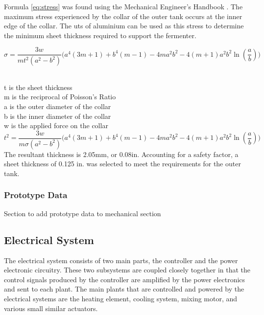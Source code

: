 \documentclass{article}
\begin{document}
Formula \ref{eq:stress} was found using the Mechanical Engineer's Handbook \cite{mech-handbook}.
The maximum stress experienced by the collar of the outer tank occurs at the inner edge of the collar.  The \gls{uts} of aluminium can be used as this stress to determine the minimum sheet thickness required to support the fermenter.

\begin{equation}
\sigma = \frac{3w}{mt^{2}(a^{2} - b^{2})}\Big(a^{4}(3m + 1) + b^{4}(m - 1) - 4ma^{2}b^{2} - 4(m + 1)a^{2}b^{2}\ln(\frac{a}{b}) \Big)
\label{eq:stress}
\end{equation}

 \\
t is the sheet thickness\\
m is the reciprocal of Poisson's Ratio\\
a is the outer diameter of the collar\\
b is the inner diameter of the collar\\
w is the applied force on the collar\\

\begin{equation}
t^{2} = \frac{3w}{m\sigma(a^{2} - b^{2})}\Big(a^{4}(3m + 1) + b^{4}(m - 1) - 4ma^{2}b^{2} - 4(m + 1)a^{2}b^{2}\ln(\frac{a}{b}) \Big)
\end{equation}
The resultant thickness is 2.05mm, or 0.08in. Accounting for a safety factor, a sheet thickness of 0.125 in. was selected to meet the requirements for the outer tank.

\subsubsection{Prototype Data}
Section to add prototype data to mechanical section

\subsection{Electrical System}
The electrical system consists of two main parts, the controller and the power electronic circuitry. These two subsystems are coupled closely together in that the control signals produced by the controller are amplified by the power electronics and sent to each plant. The main plants that are controlled and powered by the electrical systems are the heating element, cooling system, mixing motor, and various small similar actuators.
\end{document}
